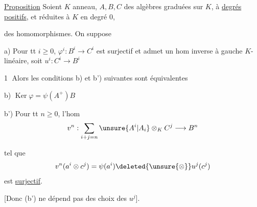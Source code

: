 \uline{Proposition} Soient $K$ anneau, $A,B,C$ des algèbres graduées sur $K$, à \uline{degrés positifs}, et réduites à $K$ en degré $0$,



des homomorphismes. On suppose

a) Pour tt $i\geq0$, $\varphi^i:B^i\longrightarrow C^i$ est surjectif et admet un hom inverse à gauche $K$-linéaire, soit $u^i:C^i\longrightarrow B^i$

\textcircled{1} Alors les conditions b) et b') suivantes sont équivalentes

b)  $\operatorname{Ker}\varphi=\psi(A^+)B$


b') Pour tt $n\geq0$, l'hom
\[
v^n:\sum_{i+j=n}\unsure{A^i|A_i}\otimes_K C^j\longrightarrow B^n
\]

 tel que
\[
 v^n(a^i\otimes c^j)=\psi(a^i)\deleted{\unsure{\otimes}}u^j(c^j)
\]
est \uline{surjectif}.

[Donc (b') ne dépend pas des choix des $u^j$].

